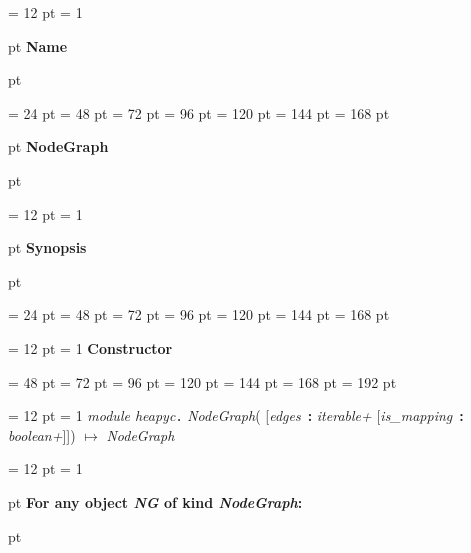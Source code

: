 {\par \noindent
{\par \pagebreak[3.300000] \noindent \hangindent = 12 pt \hangafter = 1 
{\par \pagebreak[3]  pt \noindent
{\Large {\bf Name\/}}\par {} pt
} \noindent
\par}
{\par \noindent  \leftskip = 24 pt  \leftmargini = 48 pt  \leftmarginii = 72 pt  \leftmarginiii = 96 pt  \leftmarginiv = 120 pt  \leftmarginv = 144 pt  \leftmarginvi = 168 pt {\par \pagebreak[3]  pt \noindent
{\Large {\bf NodeGraph\/}}\par {} pt
} \noindent
\par}
{\par \pagebreak[3.300000] \noindent \hangindent = 12 pt \hangafter = 1 
{\par \pagebreak[3]  pt \noindent
{\Large {\bf Synopsis\/}}\par {} pt
} \noindent
\par}
{\par \noindent  \leftskip = 24 pt  \leftmargini = 48 pt  \leftmarginii = 72 pt  \leftmarginiii = 96 pt  \leftmarginiv = 120 pt  \leftmarginv = 144 pt  \leftmarginvi = 168 pt {\par \noindent
{\par \pagebreak[3.200000] \noindent \hangindent = 12 pt \hangafter = 1 
{\large {\bf Constructor\/}}\par}
{\par \noindent  \leftskip = 48 pt  \leftmargini = 72 pt  \leftmarginii = 96 pt  \leftmarginiii = 120 pt  \leftmarginiv = 144 pt  \leftmarginv = 168 pt  \leftmarginvi = 192 pt {\par \noindent
{\par \pagebreak[3.100000] \noindent \hangindent = 12 pt \hangafter = 1 
 {\em module heapyc\/}{\large {\tt .\/} {\em NodeGraph\/}}( {[}{\em edges\/}~{\bf :}  {\em iterable+\/}  {[}{\em is{\_}mapping\/}~{\bf :}  {\em boolean+\/}]]) \(\mapsto \)  {\em NodeGraph\/}\par}
\par}
\par}
{\par \pagebreak[3.200000] \noindent \hangindent = 12 pt \hangafter = 1 
{\par \pagebreak[2]  pt \noindent
{\large {\bf For any object {\em NG\/} of kind  {\em NodeGraph\/}:\/}}\par {} pt
}}}}}
